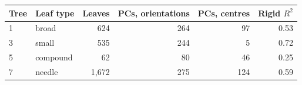 \begin{tabular}{llrrrr}
\toprule
Tree & Leaf type & Leaves & PCs, orientations & PCs, centres & Rigid $R^2$ \\
\midrule
1 & broad & 624 & 264 & 97 & 0.53 \\
3 & small & 535 & 244 & 5 & 0.72 \\
5 & compound & 62 & 80 & 46 & 0.25 \\
7 & needle & 1{,}672 & 275 & 124 & 0.59 \\
\bottomrule
\end{tabular}
